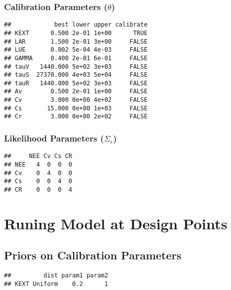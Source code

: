 \documentclass[
]{article}
\begin{document}
\hypertarget{calibration-parameters-theta}{%
\subsubsection{\texorpdfstring{Calibration Parameters
(\(\theta\))}{Calibration Parameters (\textbackslash theta)}}\label{calibration-parameters-theta}}

\begin{verbatim}
##            best lower upper calibrate
## KEXT      0.500 2e-01 1e+00      TRUE
## LAR       1.500 2e-01 3e+00     FALSE
## LUE       0.002 5e-04 4e-03     FALSE
## GAMMA     0.400 2e-01 6e-01     FALSE
## tauV   1440.000 5e+02 3e+03     FALSE
## tauS  27370.000 4e+03 5e+04     FALSE
## tauR   1440.000 5e+02 3e+03     FALSE
## Av        0.500 2e-01 1e+00     FALSE
## Cv        3.000 0e+00 4e+02     FALSE
## Cs       15.000 0e+00 1e+03     FALSE
## Cr        3.000 0e+00 2e+02     FALSE
\end{verbatim}

\hypertarget{likelihood-parameters-sigma_epsilon}{%
\subsubsection{\texorpdfstring{Likelihood Parameters
(\(\Sigma_\epsilon\))}{Likelihood Parameters (\textbackslash Sigma\_\textbackslash epsilon)}}\label{likelihood-parameters-sigma_epsilon}}

\begin{verbatim}
##     NEE Cv Cs CR
## NEE   4  0  0  0
## Cv    0  4  0  0
## Cs    0  0  4  0
## CR    0  0  0  4
\end{verbatim}

\hypertarget{runing-model-at-design-points}{%
\section{Runing Model at Design
Points}\label{runing-model-at-design-points}}

\hypertarget{priors-on-calibration-parameters}{%
\subsection{Priors on Calibration
Parameters}\label{priors-on-calibration-parameters}}

\begin{verbatim}
##         dist param1 param2
## KEXT Uniform    0.2      1
\end{verbatim}
\end{document}
